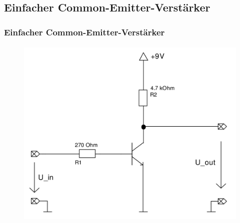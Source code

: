 \subsection{Einfacher Common-Emitter-Verstärker} %
\label{sub:Einfacher_Common-Emitter-Verstärker}
\begin{frame}
    \frametitle{Einfacher Common-Emitter-Verstärker}
    \framesubtitle{}
    \begin{figure}[H]
    \begin{center}
            \includegraphics[scale=0.2]{./img/schaltungen/common_emitter_einfach.png}
    \end{center}
    \end{figure}
\end{frame}
